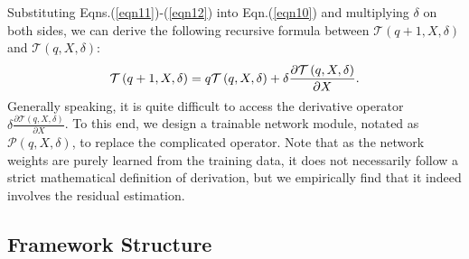 \documentclass{article}
\begin{document}
Substituting Eqns.(\ref{eqn11})-(\ref{eqn12}) into Eqn.(\ref{eqn10}) and multiplying $\delta$ on both sides, we can derive the following recursive formula between $\mathcal{T}\left(q+1, X, \delta\right)$ and $\mathcal{T}\left(q, X, \delta\right)$:
\begin{gather}
\label{eqn13}
\vspace{-0.1cm}
\mathcal{T}\left(q+1, X, \delta\right) = q\mathcal{T}\left(q,X,\delta\right) + \delta\frac{\partial\mathcal{T}\left(q,X,\delta\right)}{\partial X}.
\vspace{-0.1cm}
\end{gather}

Generally speaking, it is quite difficult to access the derivative operator $\delta\frac{\partial\mathcal{T}\left(q,X,\delta\right)}{\partial X}$. To this end, we design a trainable network module, notated as $\mathcal{P}\left(q,X,\delta\right)$, to replace the complicated operator. Note that as the network weights are purely learned from the training data, it does not necessarily follow a strict mathematical definition of derivation, but we empirically find that it indeed involves the residual estimation. 
\vspace{-0.12cm}
\subsection{Framework Structure}
\label{network-structure}
\end{document}
